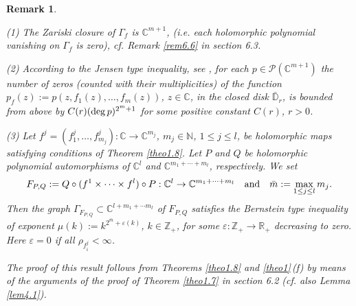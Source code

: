 \documentclass[11pt, oneside]{amsart}
\newtheorem{R}[Th]{Remark}
\begin{document}
\begin{R}\label{remark1.9}
{\rm (1) The Zariski closure of $\Gamma_f$ is $\mathbb C^{m+1}$, (i.e. each holomorphic polynomial vanishing on $\Gamma_f$ is zero), cf. Remark \ref{rem6.6} in section 6.3.\smallskip

\noindent (2) According to the Jensen type inequality, see \cite[Lm.\,1]{VP}, for each $p\in\mathcal P(\mathbb C^{m+1})$ the number of zeros (counted with their multiplicities) of the function $p_f(z):=p(z,f_1(z),\dots, f_m(z))$, $z\in\mathbb C$, in the closed disk $\bar{\mathbb D}_r$, is bounded from above by $C(r)({\rm deg}\,p)^{2^m+1}$ for some positive constant $C(r)$, $r>0$.\smallskip

\noindent (3) Let $f^j=(f_1^j,\dots, f_{m_j}^j):\mathbb C\rightarrow\mathbb C^{m_j}$, $m_j\in\mathbb N$, $1\le j\le l$, be holomorphic maps satisfying conditions of Theorem \ref{theo1.8}. Let
$P$ and $Q$ be  holomorphic polynomial automorphisms of $\mathbb C^l$ and $\mathbb C^{m_1+\cdots +m_l}$, respectively. We set 
\[
F_{P,Q}:=Q\circ (f^1\times\cdots\times f^l)\circ P:\mathbb C^l\rightarrow \mathbb C^{m_1+\cdots +m_l}\quad {\rm and}\quad \bar{m}:=\max_{1\le j\le l}m_j.
\]
Then the graph $\Gamma_{F_{P,Q}}\subset\mathbb C^{l+m_1+\cdots m_l}$ of $F_{P,Q}$ satisfies the Bernstein type inequality of exponent $\mu(k):=k^{2^{\bar{m}}+\varepsilon(k)}$, $k\in\mathbb Z_+$, for some $\varepsilon :
\mathbb Z_+\rightarrow \mathbb R_+$ decreasing to zero. Here $\varepsilon= 0$ if all $\rho_{f_i^j}<\infty$.

\noindent The proof of this result follows from Theorems \ref{theo1.8} and \ref{theo1}\,(f) by means of the arguments of the proof of Theorem \ref{theo1.7} in section 6.2 (cf. also Lemma \ref{lem4.1}).
}
\end{R}
\end{document}
